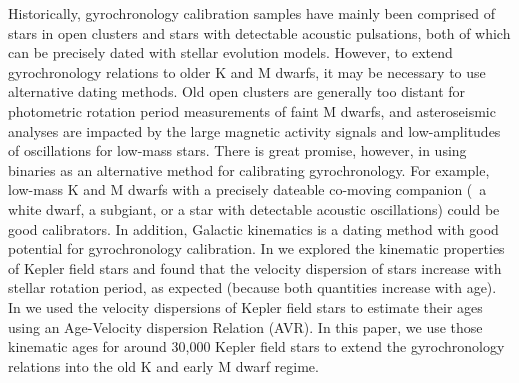 Historically, gyrochronology calibration samples have mainly been comprised of
stars in open clusters and stars with detectable acoustic pulsations, both of
which can be precisely dated with stellar evolution models.
However, to extend gyrochronology relations to older K and M dwarfs, it may be
necessary to use alternative dating methods.
Old open clusters are generally too distant for photometric rotation period
measurements of faint M dwarfs, and asteroseismic analyses are impacted by the
large magnetic activity signals and low-amplitudes of oscillations for
low-mass stars.
There is great promise, however, in using binaries as an alternative method
for calibrating gyrochronology.
For example, low-mass K and M dwarfs with a precisely dateable co-moving
companion (\eg\ a white dwarf, a subgiant, or a star with detectable acoustic
oscillations) could be good calibrators.
In addition, Galactic kinematics is a dating method with good potential for
gyrochronology calibration.
In \citet{angus2020} we explored the kinematic properties of Kepler field
stars and found that the velocity dispersion of stars increase with stellar
rotation period, as expected (because both quantities increase with age).
In \citet{lu2021} we used the velocity dispersions of Kepler field stars to
estimate their ages using an Age-Velocity dispersion Relation (AVR).
In this paper, we use those kinematic ages for around 30,000 Kepler field
stars to extend the gyrochronology relations into the old K and early M dwarf
regime.

